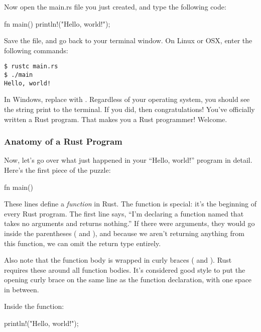 \blank

Now open the main.rs file you just created, and type the following code:

\begin{rustc}
fn main() {
    println!("Hello, world!");
}
\end{rustc}

Save the file, and go back to your terminal window. On Linux or OSX, enter the following commands:

\begin{verbatim}
$ rustc main.rs
$ ./main
Hello, world!
\end{verbatim}

In Windows, replace  with . Regardless of your operating system, you should see the string 
 print to the terminal. If you did, then congratulations! You've officially written a Rust program. 
That makes you a Rust programmer! Welcome.

\subsubsection*{Anatomy of a Rust Program}

Now, let’s go over what just happened in your \enquote{Hello, world!} program in detail. Here's the first piece of the puzzle:

\begin{rustc}
fn main() {
    
}
\end{rustc}

These lines define a \emph{function} in Rust. The  function is special: it's the beginning of every Rust program. The 
first line says, \enquote{I’m declaring a function named  that takes no arguments and returns nothing.} If there were 
arguments, they would go inside the parentheses (\code{(} and \code{)}), and because we aren’t returning anything from this function, 
we can omit the return type entirely.

\blank

Also note that the function body is wrapped in curly braces (\code{\{} and \code{\}}). Rust requires these around all function
bodies. It's considered good style to put the opening curly brace on the same line as the function declaration, with one space 
in between.

\blank

Inside the  function:

\begin{rustc}
println!("Hello, world!");
\end{rustc}

